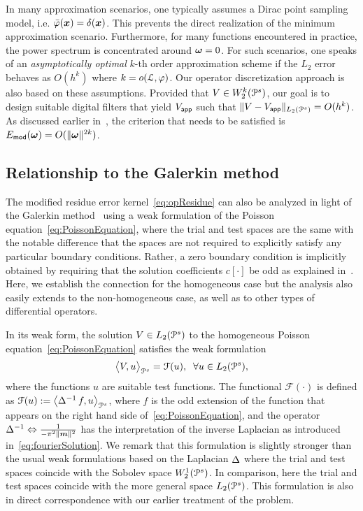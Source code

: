 In many approximation scenarios, one typically assumes a Dirac point sampling
model, i.e. ${\bar{\varphi}}(\boldsymbol{x}) = \delta(\boldsymbol{x})$.
This prevents the direct realization of the minimum approximation scenario.
Furthermore, for many functions encountered in practice, the power spectrum is
concentrated around $\boldsymbol{\omega} = 0$. For such scenarios, one speaks of an
\emph{asymptotically optimal} $k$-th order approximation scheme if the $L_2$
error behaves as $O(h^k)$ where $k = o(\mathcal{L},\varphi)$. Our operator
discretization approach is also based on these assumptions. Provided that $V \in
W_2^k(\mathcal{P}^s)$, our goal is to design suitable digital filters that yield
$V_{\mathsf{app}}$ such that $\lVert V - V_{\mathsf{app}} \rVert_{L_2(\mathcal{P}^s)} = O(h^k)$. As discussed earlier
in~, the criterion that needs to be satisfied is
$E_{\mathsf{mod}}(\boldsymbol{\omega}) = O(\lVert\boldsymbol{\omega}\rVert^{2k})$.

\subsection{Relationship to the Galerkin method}
\label{sec:Galerkin}
The modified residue error kernel~\eqref{eq:opResidue} can also be analyzed in
light of the Galerkin method~\cite{quarteroni08} using a weak formulation of the Poisson
equation~\eqref{eq:PoissonEquation}, where the trial and test spaces are the
same with the notable difference that the spaces are not required to explicitly
satisfy any particular boundary conditions. Rather, a zero boundary condition is
implicitly obtained by requiring that the solution coefficients $c[\cdot]$ be
odd as explained in~. Here, we establish the
connection for the homogeneous case but the analysis also easily extends to the
non-homogeneous case, as well as to other types of differential operators.

In its weak form, the solution $V \in L_2(\mathcal{P}^s)$ to the homogeneous
Poisson equation~\eqref{eq:PoissonEquation} satisfies the weak
formulation
\begin{equation}
  \bigl \langle V , u \bigr \rangle_{\mathcal{P}^s} = \mathcal{F}(u), \;\; \forall u \in L_2(\mathcal{P}^s),
\end{equation}
where the functions $u$ are suitable test functions. The functional
$\mathcal{F}(\cdot)$ is defined as $\mathcal{F}(u) :=
\bigl \langle \mathop{\Delta^{-1}} f , u \bigr \rangle_{\mathcal{P}^s}$, where $f$ is the odd extension of
the function that appears on the right hand side
of~\eqref{eq:PoissonEquation}, and the operator
$\mathop{\Delta^{-1}} \Leftrightarrow \tfrac{1}{-\pi^2\lVert\boldsymbol{m}\rVert^2}$ has the
interpretation of the inverse Laplacian as introduced
in~\eqref{eq:fourierSolution}. We remark that this formulation is
slightly stronger than the usual weak formulations based on the
Laplacian $\mathop{\Delta}$ where the trial and test spaces coincide with
the Sobolev space $W_2^1(\mathcal{P}^s)$. In comparison, here the trial and
test spaces coincide with the more general space $L_2(\mathcal{P}^s)$. This
formulation is also in direct correspondence with our earlier
treatment of the problem.

